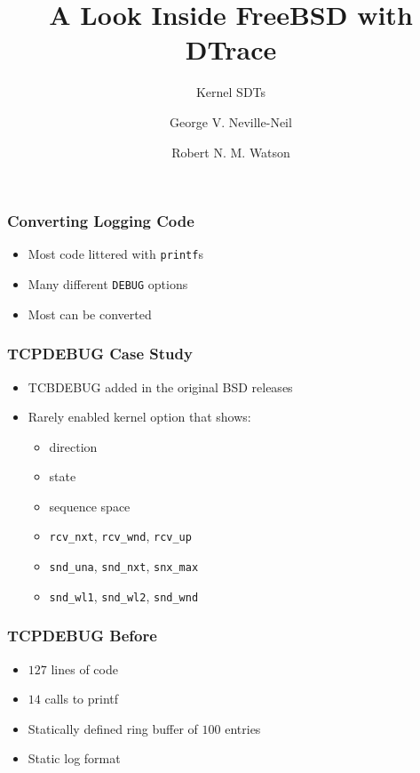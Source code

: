 \documentclass[pdftex]{beamer}
\begin{document}

\title{A Look Inside FreeBSD with DTrace}
\subtitle{Kernel SDTs}
\author[shortname]{George V. Neville-Neil \and Robert N. M. Watson}

\begin{frame}
  \titlepage
\end{frame}

\begin{frame}
  \frametitle{Converting Logging Code}
  \begin{itemize}
  \item Most code littered with \verb|printf|s
  \item Many different \verb|DEBUG| options
  \item  Most can be converted
  \end{itemize}
\end{frame}

\begin{frame}[fragile]
  \frametitle{TCPDEBUG Case Study}
  \begin{itemize}
  \item TCBDEBUG added in the original BSD releases
  \item Rarely enabled kernel option that shows:
    \begin{itemize}
    \item direction
    \item state
    \item sequence space
    \item \verb|rcv_nxt|, \verb|rcv_wnd|, \verb|rcv_up|
    \item \verb|snd_una|, \verb|snd_nxt|, \verb|snx_max|
    \item \verb|snd_wl1|, \verb|snd_wl2|, \verb|snd_wnd|
    \end{itemize}
  \end{itemize}
\end{frame}

\begin{frame}
  \frametitle{TCPDEBUG Before}
  \begin{itemize}
  \item $127$ lines of code
  \item $14$ calls to printf
  \item Statically defined ring buffer of $100$ entries
  \item Static log format
  \end{itemize}
\end{frame}
\end{document}
